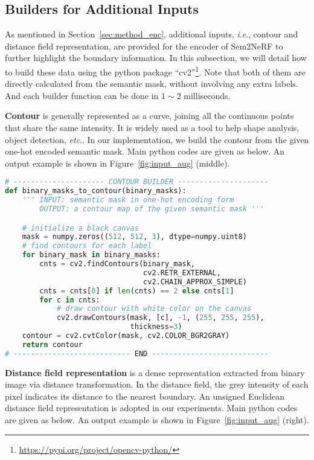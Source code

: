 \documentclass[runningheads]{llncs}
\newcommand{\ie}{\textit{i}.\textit{e}.}
\newcommand{\etc}{\textit{etc}.}
\begin{document}
\subsection{Builders for Additional Inputs} \label{sec:tech_input}

As mentioned in Section~\ref{sec:method_enc}, additional inputs, \ie, contour and distance field representation, are provided for the encoder of Sem2NeRF to further highlight the boundary information. In this subsection, we will detail how to build these data using the python package ``cv2''\footnote{\url{https://pypi.org/project/opencv-python/}}. Note that both of them are directly calculated from the semantic mask, without involving any extra labels. And each builder function can be done in $1\sim2$ milliseconds.

\textbf{Contour} is generally represented as a curve, joining all the continuous points that share the same intensity. It is widely used as a tool to help shape analysis, object detection, \etc. In our implementation, we build the contour from the given one-hot encoded semantic mask. Main python codes are given as below. An output example is shown in Figure~\ref{fig:input_aug} (middle).

\begin{lstlisting}[language=Python]
# --------------------- CONTOUR BUILDER ---------------------
def binary_masks_to_contour(binary_masks):
    ''' INPUT: semantic mask in one-hot encoding form
        OUTPUT: a contour map of the given semantic mask '''

    # initialize a black canvas
    mask = numpy.zeros((512, 512, 3), dtype=numpy.uint8)
    # find contours for each label 
    for binary_mask in binary_masks:
        cnts = cv2.findContours(binary_mask, 
                                cv2.RETR_EXTERNAL, 
                                cv2.CHAIN_APPROX_SIMPLE)
        cnts = cnts[0] if len(cnts) == 2 else cnts[1]
        for c in cnts:
            # draw contour with white color on the canvas
            cv2.drawContours(mask, [c], -1, (255, 255, 255), 
                             thickness=3)
    contour = cv2.cvtColor(mask, cv2.COLOR_BGR2GRAY)
    return contour
# --------------------------- END ---------------------------
\end{lstlisting}


\textbf{Distance field representation} is a dense representation extracted from binary image via distance transformation. In the distance field, the grey intensity of each pixel indicates its distance to the nearest boundary. An unsigned Euclidean distance field representation is adopted in our experiments. Main python codes are given as below. An output example is shown in Figure~\ref{fig:input_aug} (right).
\end{document}
